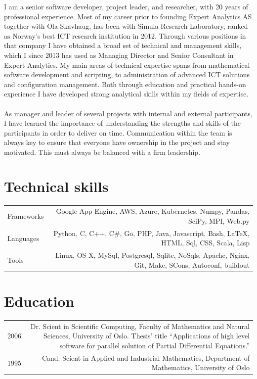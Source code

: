 \documentclass[english,a4paper,11pt]{article}
\begin{document}
I am a senior software developer, project leader, and researcher, with 20 years of professional experience. Most of my career prior to founding Expert Analytics AS together with Ola Skavhaug, has been with Simula Research Laboratory, ranked as Norway's best ICT research institution in 2012. Through various positions in that company I have obtained a broad set of technical and management skills, which I since 2013 has used as Managing Director and Senior Consultant in Expert Analytics. My main areas of technical expertise spans from mathematical software development and scripting, to administration of advanced ICT solutions and configuration management. Both through education and practical hands-on experience I have developed strong analytical skills within my fields of expertise. \\ \\ As manager and leader of several projects with internal and external participants, I have learned the importance of understanding the strengths and skills of the participants in order to deliver on time. Communication within the team is always key to ensure that everyone have ownership in the project and stay motivated. This must always be balanced with a firm leadership.\\
\Needspace{\cvneedspaceconst\baselineskip}
\section*{Technical skills}
\begin{longtable}{LR}
Frameworks & Google App Engine, AWS, Azure, Kubernetes, Numpy, Pandas, SciPy, MPI, Web.py\\ 
Languages & Python, C, C++, C\#, Go, PHP, Java, Javascript, Bash, \LaTeX, HTML, Sql, CSS, Scala, Lisp\\ 
Tools & Linux, OS X, MySql, Postgresql, Sqlite, NoSqls, Apache, Nginx, Git, Make, SCons, Autoconf, buildout\\ 
\end{longtable}

\Needspace{\cvneedspaceconst\baselineskip}
\section*{Education}
\begin{longtable}{LR}
2006 & Dr. Scient in Scientific Computing, Faculty of Mathematics and Natural Sciences, University of Oslo. Thesis' title ``Applications of high level software for parallel solution of Partial Differential Equations.''\\ 
1995 & Cand. Scient in Applied and Industrial Mathematics, Department of Mathematics, University of Oslo\\ 
\end{longtable}
\end{document}
